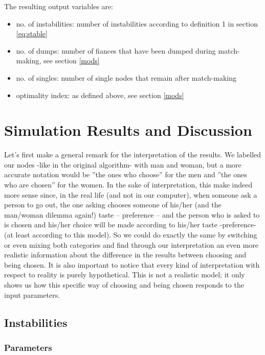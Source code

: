 \documentclass[11pt]{article}
\begin{document}
\noindent The resulting output variables are:

\begin{itemize}
  \item no. of instabilities: number of instabilities according to definition 1 in section \ref{eq:stable}
  \item no. of dumps: number of fiances that have been dumped during match-making, see section \ref{mods}
  \item no. of singles: number of single nodes that remain after match-making
  \item optimality index: as defined above, see section \ref{mods}
\end{itemize}

\section{Simulation Results and Discussion}

Let's first make a general remark for the interpretation of the results. We labelled our nodes -like in 
the original algorithm- with man and woman, but a more accurate notation would be ''the ones who 
choose'' for the men and ''the ones who are chosen'' for the women. In the sake of interpretation, 
this make indeed more sense since, in the real life (and not in our computer), when someone ask a 
person to go out, the one asking chooses someone of his/her (and the man/woman dilemma again!) 
taste -- preference -- and the person who is asked to is chosen and his/her choice will be made 
according to his/her taste -preference- (at least according to this model). So we could do exactly the 
same by switching or even mixing both categories and find through our interpretation an even more 
realistic information about the difference in the results between choosing and being chosen.
 It is also important to notice that every kind of interpretation with respect to reality is purely 
hypothetical. This is not a realistic model; it only shows us how this specific way of choosing and 
being chosen responds to the input parameters.
 

\subsection{Instabilities}

\subsubsection{Parameters}
\end{document}
